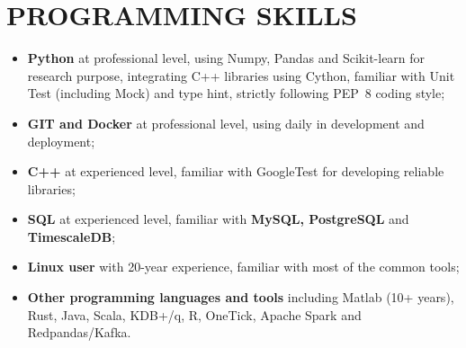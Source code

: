 \documentclass[a4paper,10pt]{article}
\begin{document}
\section{PROGRAMMING  SKILLS }
\begin{itemize}
    \item \textbf{Python} at professional level, using Numpy, Pandas and Scikit-learn for research purpose, integrating C++ libraries using Cython, familiar with Unit Test (including Mock) and type hint, strictly following PEP~8 coding style;
    \item \textbf{GIT and Docker} at professional level, using daily in development and deployment; 
    \item \textbf{C++} at experienced level, familiar with GoogleTest for developing reliable libraries;
    \item \textbf{SQL} at experienced level, familiar with \textbf{MySQL, PostgreSQL} and  \textbf{TimescaleDB};
    \item \textbf{Linux user} with 20-year experience, familiar with most of the common tools;
    \item \textbf{Other programming languages and tools} including Matlab (10+ years), Rust, Java, Scala, KDB+/q, R, OneTick, Apache Spark and Redpandas/Kafka. 
\end{itemize}
\end{document}
